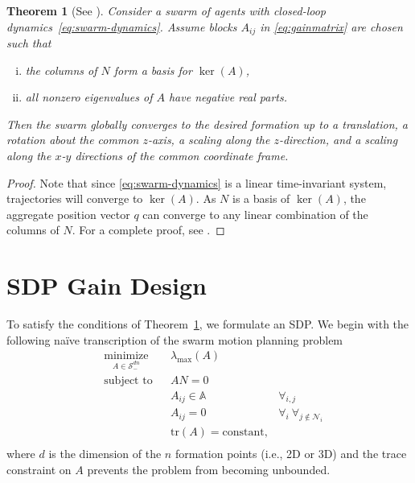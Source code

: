 \documentclass[a4paper]{article}
\newtheorem{thm}{Theorem}
\begin{document}
\begin{thm}[See {{\cite{Fathian2019,Fathian2018Dissertation}}}]\label{thm:swarm-invariance}
Consider a swarm of agents with closed-loop dynamics~\eqref{eq:swarm-dynamics}.
Assume blocks $A_{ij}$ in \eqref{eq:gainmatrix} are chosen such that
\begin{enumerate}[(i)]
  \item the columns of $N$ form a basis for $\ker(A)$,
  \item all nonzero eigenvalues of $A$ have negative real parts.
\end{enumerate}
Then the swarm globally converges to the desired formation up to a translation, a rotation about the common $z$-axis, a scaling along the $z$-direction, and a scaling along the $x$-$y$ directions of the common coordinate frame.
\end{thm}
\begin{proof}
Note that since \eqref{eq:swarm-dynamics} is a linear time-invariant system, trajectories will converge to $\ker(A)$.
As $N$ is a basis of $\ker(A)$, the aggregate position vector $q$ can converge to any linear combination of the columns of $N$.
For a complete proof, see \cite[Theorem 3, p. 29]{Fathian2018Dissertation}.
\end{proof}

\section*{SDP Gain Design}
To satisfy the conditions of Theorem~\ref{thm:swarm-invariance}, we formulate an SDP.
We begin with the following na\"ive transcription of the swarm motion planning problem
\begin{equation} \label{eq:naiveoptim}
\begin{aligned}
& \underset{A\in\mathcal{S}^{dn}_-}{\text{minimize}}
& & \lambda_{\text{max}} \left( A \right) & \\
& \text{subject to}
& & AN = 0 & \\
&&& A_{ij} \in \mathbb{A}  & \forall_{i,j} \\
&&& A_{ij} = 0 \;   & \forall_{i} \ \forall_{j \notin \mathcal{N}_i} \\
&&& \text{tr}(A) = \text{constant}, \\
\end{aligned}
\end{equation}
where $d$ is the dimension of the $n$ formation points (i.e., 2D or 3D) and the trace constraint on $A$ prevents the problem from becoming unbounded.
\end{document}
